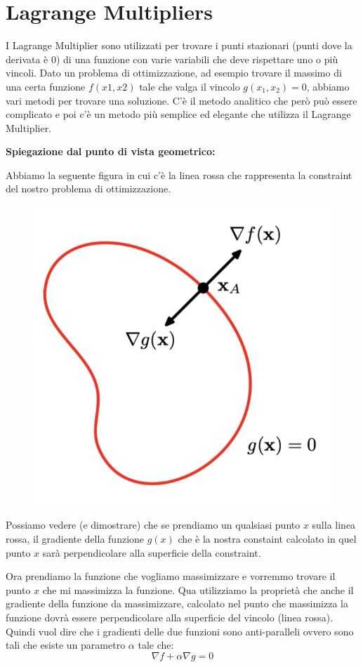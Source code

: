 \documentclass[14pt]{extreport}
\begin{document}
\section{Lagrange Multipliers}

I Lagrange Multiplier sono utilizzati per trovare i punti stazionari (punti dove la derivata è 0) di una funzione con varie variabili che deve
rispettare uno o più vincoli. Dato un problema di ottimizzazione, ad esempio trovare il massimo di una certa funzione $f(x1,x2)$ tale che valga il
vincolo $g(x_1, x_2) = 0$, abbiamo vari metodi per trovare una soluzione. C'è il metodo analitico che però può essere complicato e poi c'è un metodo
più semplice ed elegante che utilizza il Lagrange Multiplier.

\textbf{Spiegazione dal punto di vista geometrico:}

Abbiamo la seguente figura in cui c'è la linea rossa che rappresenta la constraint del nostro problema di ottimizzazione.

\begin{figure}[H]
	\centering
	\includegraphics[width=0.5\linewidth]{348.jpeg}
\end{figure}


Possiamo vedere (e dimostrare) che se prendiamo un qualsiasi punto $x$ sulla linea rossa, il gradiente della funzione $g(x)$ che è la nostra constaint
calcolato in quel punto $x$ sarà perpendicolare alla superficie della constraint.

Ora prendiamo la funzione che vogliamo massimizzare e vorremmo trovare il punto $x$ che mi massimizza la funzione. Qua utilizziamo la proprietà che
anche il gradiente della funzione da massimizzare, calcolato nel punto che massimizza la funzione dovrà essere perpendicolare alla superficie del
vincolo (linea rossa). Quindi vuol dire che i gradienti delle due funzioni sono anti-paralleli ovvero sono tali che esiste un parametro $\alpha$ tale
che: $$\nabla f + \alpha \nabla g = 0$$
\end{document}
